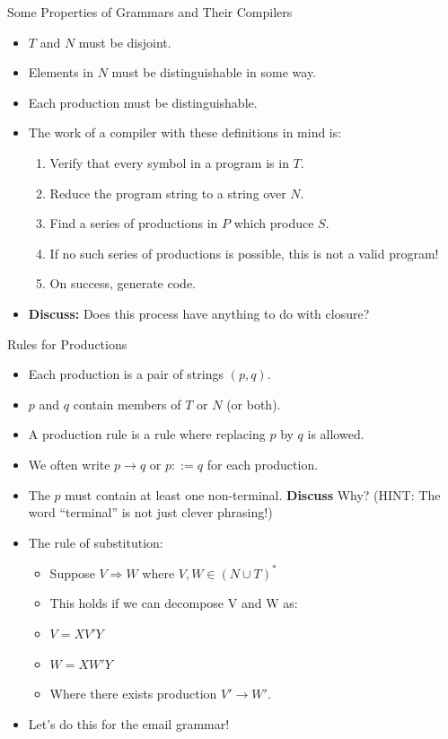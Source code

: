 \documentclass{beamer}
\begin{document}
\begin{frame}{Some Properties of Grammars and Their Compilers}
    \begin{itemize}[<+(1)->]
        \item $T$ and $N$ must be disjoint.
        \item Elements in $N$ must be distinguishable in some way.
        \item Each production must be distinguishable.
        \item The work of a compiler with these definitions in mind
            is:
            \begin{enumerate}
                \item Verify that every symbol in a program is in $T$.
                \item Reduce the program string to a string over $N$.
                \item Find a series of productions in $P$ which produce $S$.
                \item If no such series of productions is possible,
                this is not a valid program!
                \item On success, generate code.
            \end{enumerate}
        \item \textbf{Discuss:} Does this process have anything to do
            with closure?
    \end{itemize}
\end{frame}

\begin{frame}{Rules for Productions}
    \begin{itemize}[<+(1)->]
        \item Each production is a pair of strings $(p,q)$.
        \item $p$ and $q$ contain members of $T$ or $N$ (or both).
        \item A production rule is a rule where replacing $p$ by $q$ is
            allowed.
        \item We often write $p \rightarrow q$ or $p ::= q$ for each
            production.
        \item The $p$ must contain at least one non-terminal. 
            \textbf{Discuss} Why? (HINT: The word ``terminal'' is not
            just clever phrasing!)
        \item The rule of substitution:
            \begin{itemize}
                \item Suppose $V \Rightarrow W$ where $V,W \in (N \cup T)^*$
                \item This holds if we can decompose V and W as:
                \item $V=X V' Y$
                \item $W=X W' Y$
                \item Where there exists production $V' \rightarrow W'$.
            \end{itemize}
        \item Let's do this for the email grammar!
    \end{itemize}
\end{frame}
\end{document}
